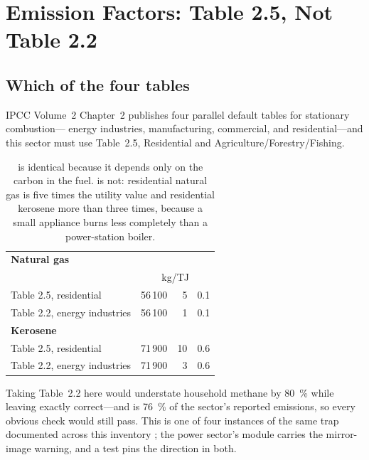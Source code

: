 \section{Emission Factors: Table 2.5, Not Table 2.2}
\label{sec:factors}

\subsection{Which of the four tables}

IPCC Volume~2 Chapter~2 publishes four parallel default tables for stationary combustion---
energy industries, manufacturing, commercial, and residential---and this sector must use
Table~2.5, Residential and Agriculture/Forestry/Fishing.

\begin{table}[htbp]
\centering
\footnotesize
\begin{tabular}{@{}lrrr@{}}
\toprule
\textbf{Natural gas} & \textbf{\COtwo{}} & \textbf{\CHfour{}} & \textbf{\NtwoO{}} \\
 & \multicolumn{3}{c}{kg/TJ} \\
\midrule
Table 2.5, residential        & 56\,100 & 5 & 0.1 \\
Table 2.2, energy industries  & 56\,100 & 1 & 0.1 \\
\midrule
\textbf{Kerosene} & & & \\
Table 2.5, residential        & 71\,900 & 10 & 0.6 \\
Table 2.2, energy industries  & 71\,900 &  3 & 0.6 \\
\bottomrule
\end{tabular}
\caption{\COtwo{} is identical because it depends only on the carbon in the fuel. \CHfour{} is
not: residential natural gas is five times the utility value and residential kerosene more than
three times, because a small appliance burns less completely than a power-station boiler.}
\label{tab:tables}
\end{table}

Taking Table~2.2 here would understate household methane by \SI{80}{\percent} while leaving
\COtwo{} exactly correct---and \COtwo{} is \SI{76}{\percent} of the sector's reported
emissions, so every obvious check would still pass. This is one of four instances of the same
trap documented across this inventory \citep{ahmad2026national}; the power sector's module
carries the mirror-image warning, and a test pins the direction in both.

